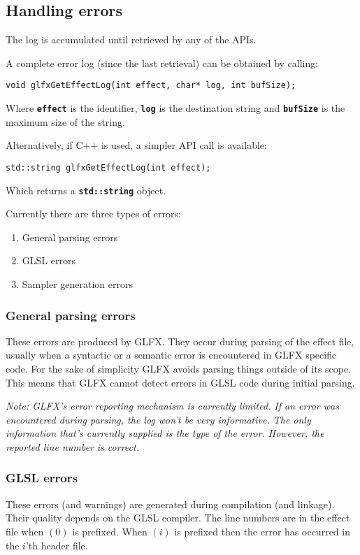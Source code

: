 \documentclass[11pt,a4paper,final,titlepage]{article}
\begin{document}
\subsection{Handling errors}
The log is accumulated until retrieved by any of the APIs.

A complete error log (since the last retrieval) can be obtained by calling:
\begin{lstlisting}
void glfxGetEffectLog(int effect, char* log, int bufSize);
\end{lstlisting}
Where \texttt{\textbf{effect}} is the identifier, \texttt{\textbf{log}} is the destination
string and \texttt{\textbf{bufSize}} is the maximum size of the string.

Alternatively, if C++ is used, a simpler API call is available:
\begin{lstlisting}
std::string glfxGetEffectLog(int effect);
\end{lstlisting}
Which returns a \texttt{\textbf{std::string}} object.

Currently there are three types of errors:
\begin{enumerate}
\item General parsing errors
\item GLSL errors
\item Sampler generation errors
\end{enumerate}

\subsubsection{General parsing errors}
These errors are produced by GLFX. They occur during parsing of the effect file, usually when
a syntactic or a semantic error is encountered in GLFX specific code.
For the sake of simplicity GLFX avoids parsing things outside of its scope.
This means that GLFX cannot detect errors in GLSL code during initial parsing.

\emph{Note: GLFX's error reporting mechanism is currently limited. If an error was encountered
during parsing, the log won't be very informative. The only information that's currently supplied
is the type of the error. However, the reported line number is correct.}

\subsubsection{GLSL errors}
These errors (and warnings) are generated during compilation (and linkage). Their quality depends on
the GLSL compiler. The line numbers are in the effect file when $(0)$ is prefixed. When $(i)$
is prefixed then the error has occurred in the $i$'th header file.
\end{document}
